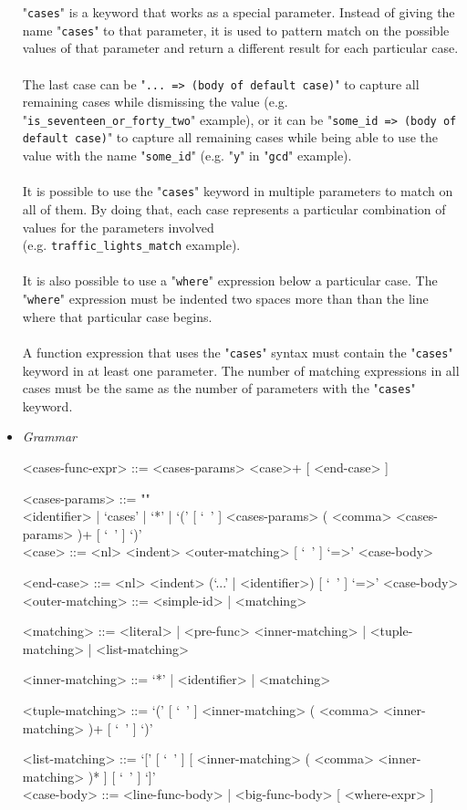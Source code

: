 \documentclass{article}
\begin{document}
\begin{itemize}
"\verb|cases|" is a keyword that works as a special parameter.  Instead of
giving the name "\verb|cases|" to that parameter, it is used to pattern match
on the possible values of that parameter and return a different result for each
particular case.
\\\\
The last case can be "\verb|... => (body of default case)|" to capture all
remaining cases while dismissing the value (e.g.
"\verb|is_seventeen_or_forty_two|" example), or it can be
"\verb|some_id => (body of default case)|" to capture all remaining
cases while being able to use the value with the name "\verb|some_id|"
(e.g.  "\verb|y|" in "\verb|gcd|" example).
\\\\
It is possible to use the "\verb|cases|" keyword in multiple parameters to match on
all of them. By doing that, each case represents a particular combination of
values for the parameters involved\\(e.g. \verb|traffic_lights_match|
example).
\\\\
It is also possible to use a "\verb|where|" expression below a particular case.
The "\verb|where|" expression must be indented two spaces more than than the
line where that particular case begins.
\\\\
A function expression that uses the "\verb|cases|" syntax must contain the
"\verb|cases|" keyword in at least one parameter. The number of matching
expressions in all cases must be the same as the number of parameters with the
"\verb|cases|" keyword.

\item \textit{Grammar}
\begin{grammar}
<cases-func-expr> ::= <cases-params> <case>+ [ <end-case> ]

<cases-params> ::=
""\\
<identifier> | `cases' | `*' |
`(' [ `\ ' ] <cases-params> ( <comma> <cases-params> )+ [ `\ ' ] `)'
\\

<case> ::=  <nl> <indent> <outer-matching> [ `\ ' ] `=>' <case-body>

<end-case> ::=
<nl> <indent> (`...' | <identifier>) [ `\ ' ] `=>' <case-body>
\\

<outer-matching> ::= <simple-id> | <matching>

<matching> ::=
<literal> | <pre-func> <inner-matching> | <tuple-matching> | <list-matching>

<inner-matching> ::= `*' | <identifier> | <matching>

<tuple-matching> ::=
`(' [ `\ ' ] <inner-matching> ( <comma> <inner-matching> )+ [ `\ ' ] `)'

<list-matching> ::=
`[' [ `\ ' ] [ <inner-matching> ( <comma> <inner-matching> )* ] [ `\ ' ]
`]'
\\

<case-body> ::= <line-func-body> | <big-func-body> [ <where-expr> ]
\end{grammar}

\end{itemize}
\end{document}
